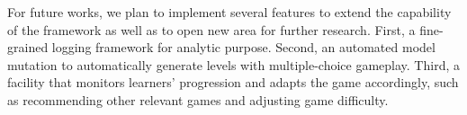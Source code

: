\documentclass[conference]{IEEEtran}
\begin{document}
For future works, we plan to implement several features to extend the capability of the framework as well as to open new area for further research. First, a fine-grained logging framework for analytic purpose. Second, an automated model mutation to automatically generate levels with multiple-choice gameplay. Third, a facility that monitors learners' progression and adapts the game accordingly, such as recommending other relevant games and adjusting game difficulty.

%
%



%
%
\end{document}

